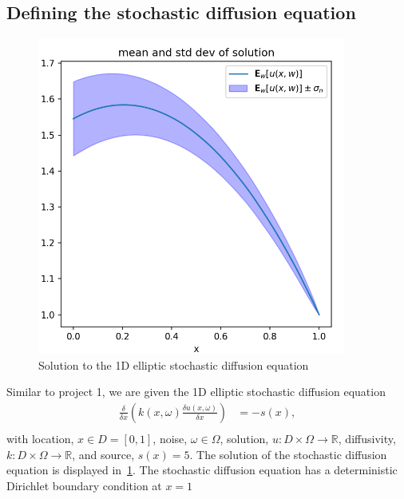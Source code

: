 \documentclass[letterpaper, 10 pt, conference, twocolumn]{ieeeconf}  %
\begin{document}
\subsection{Defining the stochastic diffusion equation}\label{sec:sde}
\begin{figure}[h]
    \centering
    \begin{minipage}[b]{.6\linewidth}
    \centering\includegraphics [trim=0 0 0 0, clip, width=0.9\textwidth, angle = 0]{figures/solution_1d_elliptic_sde}
    \end{minipage}%
\caption{Solution to the 1D elliptic stochastic diffusion equation}\label{fig:solution_1d_sde}
\end{figure}

Similar to project 1, we are given the 1D elliptic stochastic diffusion equation
\begin{equation}
\begin{aligned}
  \frac{\delta}{\delta x}(k(x,\omega) \frac{\delta u(x,\omega)}{\delta x}) &= -s(x),\\
\end{aligned} 
\label{eq:sde}
\end{equation}
with location, $x \in D = [0,1]$, noise, $\omega \in \Omega$, solution, $u:D\times\Omega \rightarrow \mathds R$, diffusivity, $k: D\times\Omega \rightarrow \mathds R$, and source, $s(x)=5$. The solution of the stochastic diffusion equation is displayed in~\cref{fig:solution_1d_sde}. The stochastic diffusion equation has a deterministic Dirichlet boundary condition at $x=1$
\end{document}

